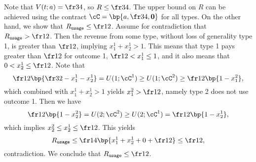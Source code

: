     Note that $V(t;a) = \fr34$, so $R \le \fr34$. The upper bound on $R$ can be achieved using the contract $\cC = \bp{a, \fr34, \mathbf{0}}$ for all types. On the other hand, we show that $\Rusage\le \fr12$. Assume for contradiction that $\Rusage > \fr12$. Then the revenue from some type, without loss of generality type 1, is greater than $\fr12$, implying $x^1_1 + x^1_2 > 1$. This means that type 1 pays greater than $\fr12$ for outcome 1, $\fr12 < x^1_1 \le 1$, and it also means that $0 < x^1_2 \le \fr12$. Note that $$\fr12 \bp{\fr32 - x^1_1 - x^1_2} = U(1;\cC^1) \ge U(1;\cC^2) \ge \fr12 \bp{1 - x^2_1},$$ which combined with $x^1_1 + x^1_2 > 1$ yields $x^2_1 > \fr12$, namely type 2 does not use outcome 1. Then we have $$\fr12 \bp{1 - x^2_2} = U(2;\cC^2) \ge U(2;\cC^1) = \fr12 \bp{1 - x^1_2},$$ which implies $x^2_2 \le x^1_2 \le \fr12$. This yields $$\Rusage \le \fr14\bp{x^1_1 + x^1_2 + 0 + \fr12} \le \fr12,$$ contradiction. We conclude that $\Rusage \le \fr12$.
    




